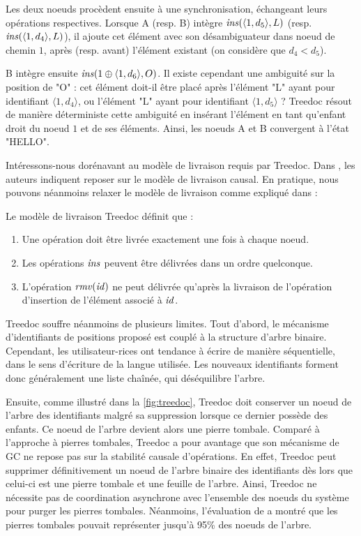 Les deux noeuds procèdent ensuite à une synchronisation, échangeant leurs opérations respectives.
Lorsque A (resp. B) intègre $\mathit{ins}(\langle 1,d_5 \rangle, L)$ (resp. $\mathit{ins}(\langle 1,d_4 \rangle, L)$), il ajoute cet élément avec son désambiguateur dans noeud de chemin $1$, après (resp. avant) l'élément existant (on considère que $d_4 < d_5$).

B intègre ensuite $\mathit{ins}(1 \oplus \langle 1,d_6 \rangle, O)$.
Il existe cependant une ambiguité sur la position de "O" : cet élément doit-il être placé après l'élément "L" ayant pour identifiant $\langle 1,d_4 \rangle$, ou l'élément "L" ayant pour identifiant $\langle 1,d_5 \rangle$ ?
Treedoc résout de manière déterministe cette ambiguité en insérant l'élément en tant qu'enfant droit du noeud $1$ et de ses éléments.
Ainsi, les noeuds A et B convergent à l'état "HELLO".

Intéressons-nous dorénavant au modèle de livraison requis par Treedoc.
Dans \cite{2009-treedoc-preguica}, les auteurs indiquent reposer sur le modèle de livraison causal.
En pratique, nous pouvons néanmoins relaxer le modèle de livraison comme expliqué dans \cite{2021-these-vic} :
\begin{definition}
  Le modèle de livraison Treedoc définit que :
  \begin{enumerate}
    \item Une opération doit être livrée exactement une fois à chaque noeud.
    \item Les opérations $\mathit{ins}$ peuvent être délivrées dans un ordre quelconque.
    \item L'opération $\mathit{rmv}(\mathit{id})$ ne peut délivrée qu'après la livraison de l'opération d'insertion de l'élément associé à $\mathit{id}$.
  \end{enumerate}
\end{definition}

Treedoc souffre néanmoins de plusieurs limites.
Tout d'abord, le mécanisme d'identifiants de positions proposé est couplé à la structure d'arbre binaire.
Cependant, les utilisateur-rices ont tendance à écrire de manière séquentielle, \ie dans le sens d'écriture de la langue utilisée.
Les nouveaux identifiants forment donc généralement une liste chaînée, qui déséquilibre l'arbre.

Ensuite, comme illustré dans la \autoref{fig:treedoc}, Treedoc doit conserver un noeud de l'arbre des identifiants malgré sa suppression lorsque ce dernier possède des enfants.
Ce noeud de l'arbre devient alors une pierre tombale.
Comparé à l'approche à pierres tombales, Treedoc a pour avantage que son mécanisme de \ac{GC} ne repose pas sur la stabilité causale d'opérations.
En effet, Treedoc peut supprimer définitivement un noeud de l'arbre binaire des identifiants dès lors que celui-ci est une pierre tombale et une feuille de l'arbre.
Ainsi, Treedoc ne nécessite pas de coordination asynchrone avec l'ensemble des noeuds du système pour purger les pierres tombales.
Néanmoins, l'évaluation de \cite{2009-treedoc-preguica} a montré que les pierres tombales pouvait représenter jusqu'à 95\% des noeuds de l'arbre.

